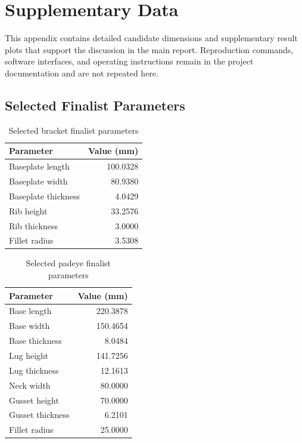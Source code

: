 \chapter{Supplementary Data}
\label{chap:appendix}

This appendix contains detailed candidate dimensions and supplementary result
plots that support the discussion in the main report. Reproduction commands,
software interfaces, and operating instructions remain in the project
documentation and are not repeated here.

\section{Selected Finalist Parameters}
\label{app:finalist-parameters}

\renewcommand{\arraystretch}{1.18}

\begin{table}[H]
\centering
\caption{Selected bracket finalist parameters}
\label{tab:app-bracket-finalist}
\begin{tabularx}{\textwidth}{Xr}
\toprule
\textbf{Parameter} & \textbf{Value (mm)}\\
\midrule
Baseplate length & 100.0328\\
Baseplate width & 80.9380\\
Baseplate thickness & 4.0429\\
Rib height & 33.2576\\
Rib thickness & 3.0000\\
Fillet radius & 3.5308\\
\bottomrule
\end{tabularx}
\end{table}

\begin{table}[H]
\centering
\caption{Selected padeye finalist parameters}
\label{tab:app-padeye-finalist}
\begin{tabularx}{\textwidth}{Xr}
\toprule
\textbf{Parameter} & \textbf{Value (mm)}\\
\midrule
Base length & 220.3878\\
Base width & 150.4654\\
Base thickness & 8.0484\\
Lug height & 141.7256\\
Lug thickness & 12.1613\\
Neck width & 80.0000\\
Gusset height & 70.0000\\
Gusset thickness & 6.2101\\
Fillet radius & 25.0000\\
\bottomrule
\end{tabularx}
\end{table}

